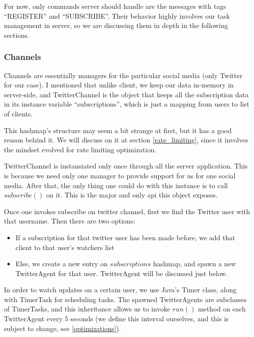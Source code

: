 \documentclass{article}
\begin{document}
\par For now, only commands server should handle are the messages with tags ``REGISTER'' and ``SUBSCRIBE''. Their behavior highly involves our task management in server, so we are discussing them in depth in the following sections.

\newpage

\subsubsection{Channels}
\label{channels}
Channels are essentially managers for the particular social media (only Twitter for our case). I mentioned that unlike client, we keep our data in-memory in server-side, and TwitterChannel is the object that keeps all the subscription data in its instance variable ``subscriptions'', which is just a mapping from users to list of clients.

\par This hashmap's structure may seem a bit strange at first, but it has a good reason behind it. We will discuss on it at section \ref{rate_limiting}, since it involves the mindset evolved for rate limiting optimization.

\par TwitterChannel is instansiated only once through all the server application. This is because we need only one manager to provide support for us for one social media. After that, the only thing one could do with this instance is to call $subscribe()$ on it. This is the major and only api this object exposes.

\par Once one invokes subscribe on twitter channel, first we find the Twitter user with that username. Then there are two options:
\begin{itemize}
  \item If a subscription for that twitter user has been made before, we add that client to that user's watchers list
  \item Else, we create a new entry on $subscriptions$ hashmap, and spawn a new TwitterAgent for that user. TwitterAgent will be discussed just below.
\end{itemize}

\par In order to watch updates on a certain user, we use Java's Timer class, along with TimerTask for scheduling tasks. The spawned TwitterAgents are subclasses of TimerTasks, and this inheritance allows us to invoke $run()$ method on each TwitterAgent every 5 seconds (we define this interval ourselves, and this is subject to change, see \ref{optimizations}).
\end{document}
